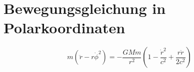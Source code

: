 \section{Bewegungsgleichung in Polarkoordinaten}
\[ m(\ddot{r} - r\dot{\phi}^2) = -\frac{GMm}{r^2}\left(1 - \frac{\dot{r}^2}{c^2} + \frac{r\ddot{r}}{2c^2}\right) \]